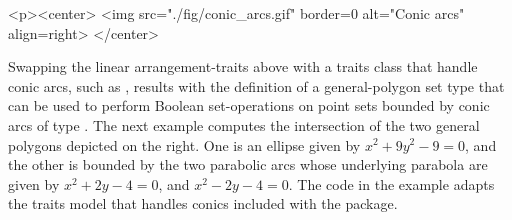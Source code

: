 \lcTex{%
  \setlength{\widthRight}{5.4cm}
  \setlength{\widthLeft}{\widthLineReal}
  \addtolength{\widthLeft}{-\widthRight}
  \begin{minipage}{\widthLeft}
}
\label{fig:conics}
\begin{ccHtmlOnly}
  <p><center>
    <img src="./fig/conic_arcs.gif" border=0 alt="Conic arcs" align=right>
  </center>
\end{ccHtmlOnly}
Swapping the linear arrangement-traits 
above with a traits class that handle conic arcs, such as
, results with the definition of a
general-polygon set type that can be used to perform Boolean 
set-operations on point sets bounded by conic arcs of type
. The next example computes the intersection of the
two general polygons depicted on the right. One is an ellipse
given by $x^2 + 9y^2 - 9 = 0$, and the other is bounded by the two
parabolic arcs whose underlying parabola are given by 
$x^2 + 2y - 4 = 0$, and $x^2 - 2y - 4 = 0$. The code in the example adapts
the traits model that handles conics included with the 
package.


